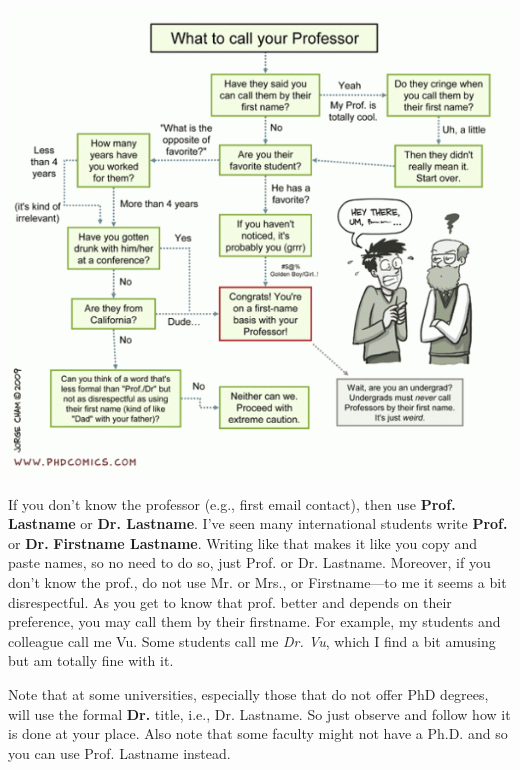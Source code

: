 \documentclass[11pt]{article}
\begin{document}
      \begin{center}
        \includegraphics[scale=0.5]{c5.png}
      \end{center}

If you don't know the professor (e.g., first email contact), then use \textbf{Prof. Lastname} or \textbf{Dr. Lastname}. I've seen many international students write \textbf{Prof.} or \textbf{Dr.} \textbf{Firstname Lastname}.  Writing like that makes it like you copy and paste names, so no need to do so,  just Prof. or Dr. Lastname.
Moreover, if you don't know the prof., do not use Mr. or Mrs., or Firstname---to me it seems a bit disrespectful. As you get to know that prof. better and depends on their preference, you may call them by their firstname.  For example, my students and colleague call me Vu. Some students call me \emph{Dr. Vu}, which I find a bit amusing but am totally fine with it. 

Note that at some universities, especially those that do not offer PhD degrees, will use the formal \textbf{Dr.} title, i.e., Dr. Lastname.  So just observe and follow how it is done at your place.  Also note that some faculty might not have a Ph.D. and so you can use Prof. Lastname instead.
\end{document}
